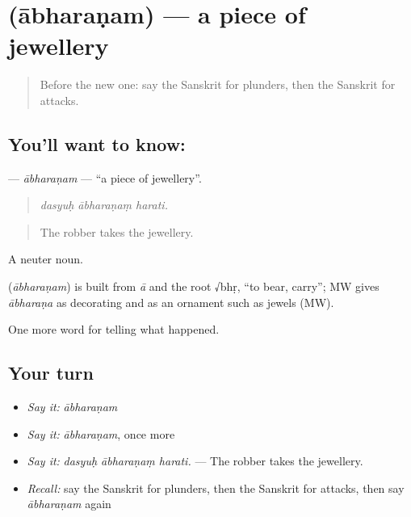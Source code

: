 \section[\texorpdfstring{\sk{आभरणम्} (ābharaṇam)}{आभरणम् (ābharaṇam)}]{ (ābharaṇam) — a piece of jewellery}

\label{lesson:SA-C290-abharanam}



\begin{quote}
Before the new one: say the Sanskrit for plunders, then the Sanskrit for attacks.
\end{quote}

\subsection*{You'll want to know: }
\textbf{} — \emph{ābharaṇam} — \textquotedblleft{}a piece of jewellery\textquotedblright{}.

\begin{quote}
  
\end{quote}

\begin{quote}
\emph{dasyuḥ ābharaṇaṃ harati.}
\end{quote}

\begin{quote}
The robber takes the jewellery.
\end{quote}

A neuter noun.

\begin{cousinweb}
\textbf{} (\emph{ābharaṇam}) is built from \emph{ā} and the root √bhṛ, \textquotedblleft{}to bear, carry\textquotedblright{}; MW gives \emph{ābharaṇa} as decorating and as an ornament such as jewels (MW).
\end{cousinweb}

\begin{grammarlens}[title={What you've built}]
One more word for telling what happened.
\end{grammarlens}

\subsection*{Your turn}
\begin{itemize}
\raggedright
  \item \emph{Say it:} \emph{ābharaṇam}
  \item \emph{Say it:} \emph{ābharaṇam}, once more
  \item \emph{Say it:} \emph{dasyuḥ ābharaṇaṃ harati.} — The robber takes the jewellery.
  \item \emph{Recall:} say the Sanskrit for plunders, then the Sanskrit for attacks, then say \emph{ābharaṇam} again
\end{itemize}

